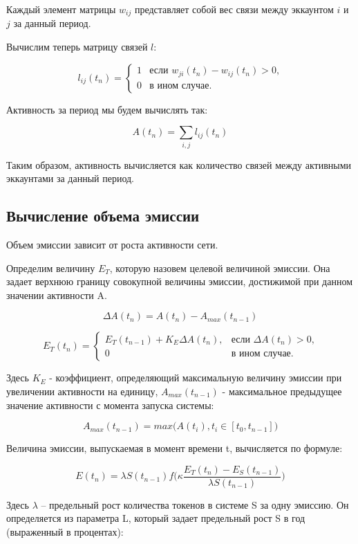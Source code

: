 \documentclass[a4paper,12pt]{article}
\begin{document}
Каждый элемент матрицы $w_{ij}$ представляет собой вес связи между эккаунтом $i$ и $j$ за данный период.

Вычислим теперь матрицу связей $l$:

$$
l_{ij}(t_n) = \begin{cases}
 1
 & \text{если $w_{ji}(t_n)-w_{ij}(t_n) > 0$,}\\
 0 & \text{в ином случае.}
\end{cases}
$$

Активность за период мы будем вычислять так:

$$
A(t_n) = \sum_{i,j} l_{ij}(t_n)
$$

Таким образом, активность вычисляется как количество связей между активными эккаунтами за данный период.

\subsection{Вычисление объема эмиссии}

Объем эмиссии зависит от роста активности сети.

Определим величину $E_T$, которую назовем целевой величиной эмиссии. Она задает верхнюю границу совокупной величины эмиссии, достижимой при данном значении активности A.

$$
\Delta A(t_n) = A(t_n) - A_{max}(t_{n-1})
$$

$$
E_T(t_n) = \begin{cases}
 E_T(t_{n-1}) + K_E \Delta A(t_n),
 & \text{если $\Delta A(t_n) > 0$,}\\
 0 & \text{в ином случае.}
\end{cases}
$$

Здесь $K_E$ - коэффициент, определяющий максимальную величину эмиссии при увеличении активности на единицу, $A_{max}(t_{n-1})$ - максимальное предыдущее значение активности с момента запуска системы:

$$
    A_{max}(t_{n-1}) = max \Big ( A(t_i), t_i \in [t_0, t_{n-1}] \Big )
$$

Величина эмиссии, выпускаемая в момент времени t, вычисляется по формуле:

$$
    E(t_n) = \lambda S(t_{n-1}) f \Big( \kappa \frac {E_T(t_n) - E_S(t_{n-1})}{\lambda S(t_{n-1})} \Big)
$$

Здесь $\lambda$ -- предельный рост количества токенов в системе S за одну эмиссию. Он определяется из параметра L, который задает предельный рост S в год (выраженный в процентах):
\end{document}
